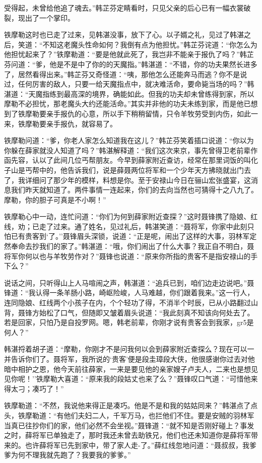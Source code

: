 \documentclass[12pt,oneside]{book}
\begin{document}
受得起，未曾给他追了魂去。''韩芷芬定睛看时，只见父亲的后心已有一幅衣裳破裂，现出了一个掌印。

铁摩勒这时也已走了过来，见韩湛没事，放下了心。以子婿之礼，见过了韩湛之后，笑道：``不知这老魔头性命如何？我倒有点为他担忧。''韩芷芬诧道：``你怎么为他担忧起来了？''铁摩勒道：``要是他就此死了，我岂非不能亲于报仇了吗？''韩芷芬问道：``爹，他是不是中了你的的天魔指。''韩湛道：``不错，你的功夫果然长进多了，居然看得出来。''韩芷芬又奇怪道：``咦，那他怎么还能奔马而逃？你不是说过，任何厉害的敌人，只要一给天魔指点中，就决难活命，要命毙当场的吗？''韩湛道：``天魔指练到最高深的境界，确能如此。但我的功夫却未曾练得到家，所以摩勒不必担忧，那老魔头大约还能活命。''其实并非他的功夫未练到家，而是他已想到了铁摩勒要亲手报仇的心意，所以手下稍稍留情，只令羊牧劳受到内伤，如此一来，铁摩勒要亲手报仇，就容易了。

铁摩勒问道：``爹，你老人家怎么知道我在这儿？''韩芷芬笑着插口说道：``你以为你躲在薛家就没人知道了吗？''韩湛解释道：``我们这次来京，事先曾得卫老前辈作函先容，认以了此间几位丐帮朋友。今早到薛家附近查访，经常在那里词饭的叫化子山是丐帮中的，他告诉我们，说是薛聂两位将军和一个少年天方拂晓就出门去了，我详细问了那少年的模样，料想是你。至于安禄山今日在骊山宏张盛宴，这消息我们昨天就知道了。两件事情一连起来，你们的去向当然也可猜得十之八九了。摩勒，你的胆子可真是不小啊！''

铁摩勒心中一动，连忙问道：``你们为何到薛家附近查探？''这时聂锋携了隐娘、红线，劝；已走了过来。通了姓名，见过礼后，韩湛笑道：``聂将军，你家中此刻只怕已有贵客到`了。''聂锋眉头深锁，说道：``正是呢，闹出了这样的大事，羽林军定然奉命去抄我们的家了。''韩湛道：``哦，你们闹出了什么大事？我正自不明白，聂将军你何以也与羊牧劳作对？''聂锋也说道：``原来你所指的贵客不是指安禄山的手下么？''

说话之间，只听得山上人马喧闹之声，韩湛道：``追兵已到，咱们边走边说吧。''聂锋道：``我认得一条羊肠小路，崎岖险峻，人马难越，你们跟着我来。''这一行人，连同隐娘、红线两个小孩子在内，个个轻功了得，不消半个时辰，已从小路翻过山背，聂锋方始松了口气，但随即又皱着眉头说道：``我此刻真不知该向何处去了。若是回家，只怕乃是自投罗网。嗯，韩老前辈，你刚才说有贵客会到我家，gr5是何人？''

韩湛捋着胡子道：``摩勒，你刚才不是问我何以会到薛家附近查探么？现在可以一并告诉你们了。聂将军，我所说的`贵客'便是段圭璋段大侠，他很感谢你过去对他暗中相护之恩，他今天前往薛家，一来是要见他的亲家嫂子卢夫人，二来也是想见见你呢！''铁摩勒大喜道：``原来我的段姑丈也来了么？''聂锋叹口气道：``可惜他来得太刁；凑巧了！''

铁摩勒道：``不然，我说他来得正是凑巧。他是不是和我的姑姑同来？''韩湛点了点头，铁摩勒道：``有他们夫妇二人，千军万马，也拦他们不住。要是安贼的羽林军当真已往抄你们的家，他们必然不会坐视。''聂锋道：``就不知是否刚好碰上？事发之时，薛将军已单独走了，那时我还未曾去助铁兄，他们也还未知道你是薛将军带来的。也许薛将军已先到家中，带了家人走-了。''薛红线忽地问道：``聂叔叔，我爹爹为何不理我就先跑了？我要我的爹爹。''
\end{document}
